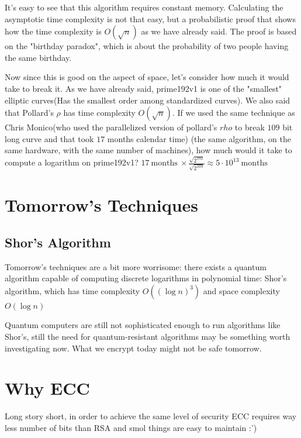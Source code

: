 \documentclass[12pt,letterpaper]{article}
\begin{document}
It's easy to see that this algorithm requires constant memory. Calculating the asymptotic time complexity is not that easy, but a probabilistic proof that shows how the time complexity is $O(\sqrt{n})$ as we have already said. The proof is based on the "birthday paradox", which is about the probability of two people having the same birthday.

Now since this is good on the aspect of space, let's consider how much it would take to break it. As we have already said, prime192v1 is one of the "smallest" elliptic curves(Has the smallest order among standardized curves). We also said that Pollard's $\rho$ has  time complexity $O(\sqrt{n})$. If we used the same technique as Chris Monico(who used the parallelized version of pollard's $rho$ to break $109$ bit long curve and that took $17$ months calendar time) (the same algorithm, on the same hardware, with the same number of machines), how much would it take to compute a logarithm on prime192v1?
$17\ \text{months}\ \times \frac{\sqrt{2^{192}}}{\sqrt{2^{109}}} \approx 5 \cdot 10^{13}\ \text{months}$
\section{Tomorrow's Techniques}
\subsection{Shor's Algorithm}
Tomorrow's techniques are a bit more worrisome: there exists a quantum algorithm capable of computing discrete logarithms in polynomial time: Shor's algorithm, which has time complexity $O((\log n)^3)$ and space complexity $O(\log n)$

Quantum computers are still not sophisticated enough to run algorithms like Shor's, still the need for quantum-resistant algorithms may be something worth investigating now. What we encrypt today might not be safe tomorrow.
\section{Why ECC}
Long story short, in order to achieve the same level of security ECC requires way less number of bits than RSA and smol things are easy to maintain :')
\end{document}
